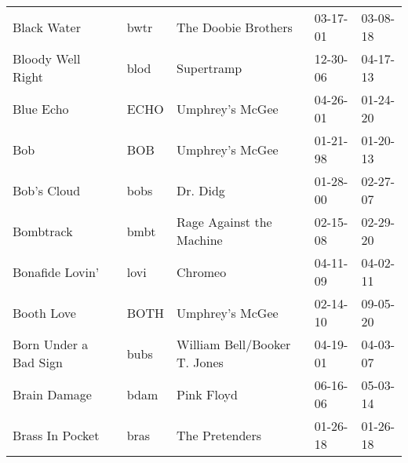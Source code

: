 \begin{longtable}{p{}p{}p{}p{}p{}}
                                                             Black Water &          bwtr &                                      The Doobie Brothers &              03-17-01 &             03-08-18 \\
                                                       Bloody Well Right &          blod &                                               Supertramp &              12-30-06 &             04-17-13 \\
                                                               Blue Echo &          ECHO &                                          Umphrey's McGee &              04-26-01 &             01-24-20 \\
                                                                     Bob &           BOB &                                          Umphrey's McGee &              01-21-98 &             01-20-13 \\
                                                             Bob's Cloud &          bobs &                                                 Dr. Didg &              01-28-00 &             02-27-07 \\
                                                               Bombtrack &          bmbt &                                 Rage Against the Machine &              02-15-08 &             02-29-20 \\
                                                         Bonafide Lovin' &          lovi &                                                  Chromeo &              04-11-09 &             04-02-11 \\
                                                              Booth Love &          BOTH &                                          Umphrey's McGee &              02-14-10 &             09-05-20 \\
                                                   Born Under a Bad Sign &          bubs &                             William Bell/Booker T. Jones &              04-19-01 &             04-03-07 \\
                                                            Brain Damage &          bdam &                                               Pink Floyd &              06-16-06 &             05-03-14 \\
                                                         Brass In Pocket &          bras &                                           The Pretenders &              01-26-18 &             01-26-18 \\

\end{longtable}
